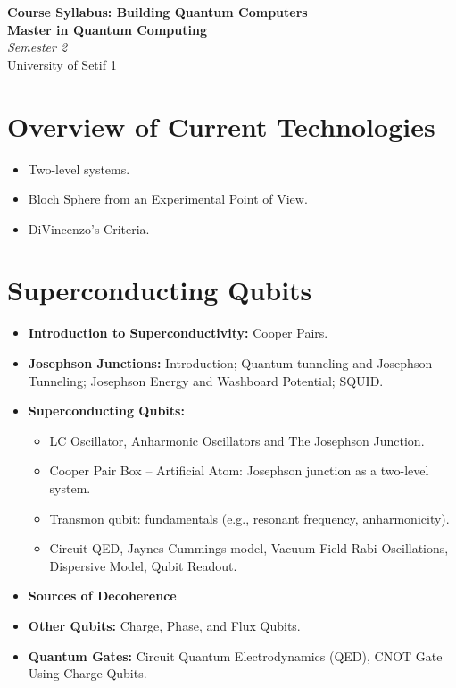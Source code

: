 \documentclass[11pt,a4paper]{article}
\begin{document}
\begin{center}
    {\LARGE \textbf{Course Syllabus: Building Quantum Computers}} \\
    \vspace{0.5em}
    {\large \textbf{Master in Quantum Computing}} \\
    \vspace{0.2em}
    {\large \textit{Semester 2}}\\
    \vspace{1em}
    {\large University of Setif 1}
\end{center}

\vspace{1.5em}

\section{Overview of Current Technologies}
\begin{itemize}[noitemsep]
    \item Two-level systems.
    \item Bloch Sphere from an Experimental Point of View.
    \item DiVincenzo's Criteria.
\end{itemize}

\section{Superconducting Qubits}
\begin{itemize}
    \item \textbf{Introduction to Superconductivity:} Cooper Pairs.
    \item \textbf{Josephson Junctions:} Introduction; Quantum tunneling and Josephson Tunneling; Josephson Energy and Washboard Potential; SQUID.
    \item \textbf{Superconducting Qubits:}
    \begin{itemize}[noitemsep]
        \item LC Oscillator, Anharmonic Oscillators and The Josephson Junction.
        \item Cooper Pair Box -- Artificial Atom: Josephson junction as a two-level system.
        \item Transmon qubit: fundamentals (e.g., resonant frequency, anharmonicity).
        \item Circuit QED, Jaynes-Cummings model, Vacuum-Field Rabi Oscillations, Dispersive Model, Qubit Readout.
    \end{itemize}
    \item \textbf{Sources of Decoherence}
    \item \textbf{Other Qubits:} Charge, Phase, and Flux Qubits.
    \item \textbf{Quantum Gates:} Circuit Quantum Electrodynamics (QED), CNOT Gate Using Charge Qubits.
\end{itemize}
\end{document}
